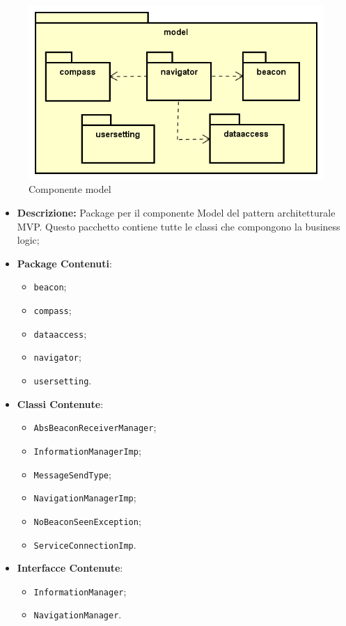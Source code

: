 \documentclass[../DefinizioneDiProdotto.tex]{subfiles}
\begin{document}
    \begin{figure}[H]
        \centering
        \includegraphics{img/package/model.png}
        \caption{Componente model}\label{fig:model} 
    \end{figure}
    \begin{itemize}
\item \textbf{Descrizione:} Package per il componente Model del pattern architetturale MVP. Questo pacchetto contiene tutte le classi che compongono la business logic;
\item \textbf{Package Contenuti}:
\begin{itemize}
\item \texttt{beacon};

\item \texttt{compass};

\item \texttt{dataaccess};

\item \texttt{navigator};

\item \texttt{usersetting}.

\end{itemize}
\item \textbf{Classi Contenute}:
\begin{itemize}
\item \texttt{AbsBeaconReceiverManager};

\item \texttt{InformationManagerImp};

\item \texttt{MessageSendType};

\item \texttt{NavigationManagerImp};

\item \texttt{NoBeaconSeenException};

\item \texttt{ServiceConnectionImp}.

\end{itemize}
\item \textbf{Interfacce Contenute}:
\begin{itemize}
\item \texttt{InformationManager};

\item \texttt{NavigationManager}.

\end{itemize}
\end{itemize}
\end{document}
